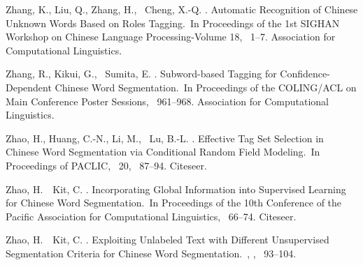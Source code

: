 \documentclass[english]{jnlp_1.4}
\begin{document}
\begin{thebibliography}{}
Zhang, K., Liu, Q., Zhang, H., \BBA\ Cheng, X.-Q. \BBCP.
\newblock \BBOQ Automatic Recognition of Chinese Unknown Words Based on Roles
  Tagging.\BBCQ\
\newblock In {\Bem Proceedings of the 1st SIGHAN Workshop on Chinese Language
  Processing-Volume 18}, \mbox{\BPGS\ 1--7}. Association for Computational
  Linguistics.

Zhang, R., Kikui, G., \BBA\ Sumita, E. \BBCP.
\newblock \BBOQ Subword-based Tagging for Confidence-Dependent Chinese Word
  Segmentation.\BBCQ\
\newblock In {\Bem Proceedings of the COLING/ACL on Main Conference Poster
  Sessions}, \mbox{\BPGS\ 961--968}. Association for Computational Linguistics.

Zhao, H., Huang, C.-N., Li, M., \BBA\ Lu, B.-L. \BBCP.
\newblock \BBOQ Effective Tag Set Selection in Chinese Word Segmentation via
  Conditional Random Field Modeling.\BBCQ\
\newblock In {\Bem Proceedings of PACLIC}, \lowercase{\BVOL}~20, \mbox{\BPGS\
  87--94}. Citeseer.

Zhao, H.\BBACOMMA\ \BBA\ Kit, C. \BBOP 2007\BBCP.
\newblock \BBOQ Incorporating Global Information into Supervised Learning for
  Chinese Word Segmentation.\BBCQ\
\newblock In {\Bem Proceedings of the 10th Conference of the Pacific
  Association for Computational Linguistics}, \mbox{\BPGS\ 66--74}. Citeseer.

Zhao, H.\BBACOMMA\ \BBA\ Kit, C. \BBOP 2008\BBCP.
\newblock \BBOQ Exploiting Unlabeled Text with Different Unsupervised
  Segmentation Criteria for Chinese Word Segmentation.\BBCQ\
, {}, \mbox{\BPGS\
  93--104}.

\end{thebibliography}
\end{document}
